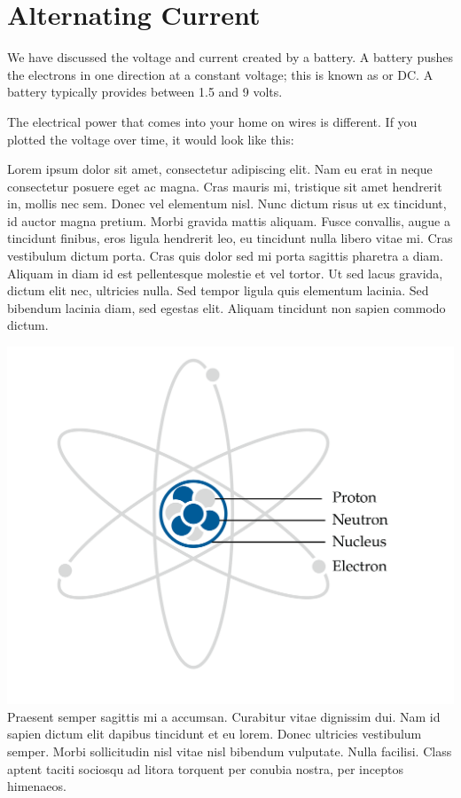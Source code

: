 \chapter{Alternating Current}

We have discussed the voltage and current created by a battery.  A
battery pushes the electrons in one direction at a constant voltage;
this is known as  or DC. A battery typically
provides between 1.5 and 9 volts.

The electrical power that comes into your home on wires is
different. If you plotted the voltage over time, it would look like
this:

Lorem ipsum dolor sit amet, consectetur adipiscing elit. Nam eu erat in neque consectetur posuere eget ac magna. Cras mauris mi, tristique sit amet hendrerit in, mollis nec sem. Donec vel elementum nisl. Nunc dictum risus ut ex tincidunt, id auctor magna pretium. Morbi gravida mattis aliquam. Fusce convallis, augue a tincidunt finibus, eros ligula hendrerit leo, eu tincidunt nulla libero vitae mi. Cras vestibulum dictum porta. Cras quis dolor sed mi porta sagittis pharetra a diam. Aliquam in diam id est pellentesque molestie et vel tortor. Ut sed lacus gravida, dictum elit nec, ultricies nulla. Sed tempor ligula quis elementum lacinia. Sed bibendum lacinia diam, sed egestas elit. Aliquam tincidunt non sapien commodo dictum.

\includegraphics[width=1\textwidth]{testimage_Atom COLOR.png}
Praesent semper sagittis mi a accumsan. Curabitur vitae dignissim dui. Nam id sapien dictum elit dapibus tincidunt et eu lorem. Donec ultricies vestibulum semper. Morbi sollicitudin nisl vitae nisl bibendum vulputate. Nulla facilisi. Class aptent taciti sociosqu ad litora torquent per conubia nostra, per inceptos himenaeos.

